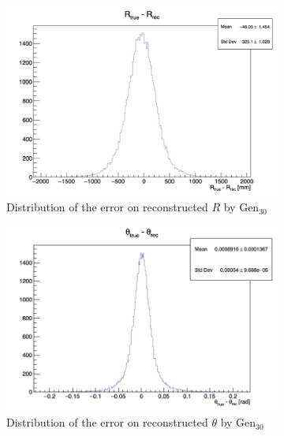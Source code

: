 \documentclass[../main.tex]{subfiles}
\begin{document}
\begin{figure}[ht]
  \begin{subfigure}[t]{0.32\linewidth}
    \centering
    \includegraphics[width=\linewidth]{images/jcnn/vic_cnn/cnn_delta_r.png}
    \caption{Distribution of the error on reconstructed $R$ by $\mathrm{Gen}_{30}$}
    \label{fig:jcnn:vic_cnn:cnn_delta_r}
  \end{subfigure}
  \begin{subfigure}[t]{0.32\linewidth}
    \centering
    \includegraphics[width=\linewidth]{images/jcnn/vic_cnn/cnn_delta_theta.png}
    \caption{Distribution of the error on reconstructed $\theta$ by $\mathrm{Gen}_{30}$}
    \label{fig:jcnn:vic_cnn:cnn_delta_theta}
  \end{subfigure}
  \begin{subfigure}[t]{0.32\linewidth}
    \centering

\end{subfigure}
\end{figure}
\end{document}
